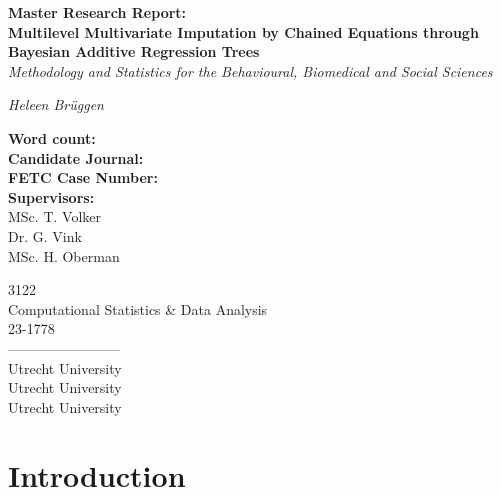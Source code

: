 \documentclass[10pt, a4paper, titlepage]{article}
\begin{document}
\begin{titlingpage}
\begin{center}
\Huge\textbf{Master Research Report:  \\ Multilevel Multivariate Imputation by Chained Equations through Bayesian Additive Regression Trees} \\
\Large\textit{Methodology and Statistics for the Behavioural, Biomedical and Social Sciences}

\vspace{.5cm}

\normalsize\textit{Heleen Brüggen}

\vspace{15cm}

\begin{minipage}{0.5\textwidth}
\begin{flushleft}

\textbf{Word count:} \\
\textbf{Candidate Journal:} \\
\textbf{FETC Case Number:} \\
\textbf{Supervisors:} \\
MSc. T. Volker \\
Dr. G. Vink \\
 MSc. H. Oberman
\end{flushleft}
\end{minipage}%
\begin{minipage}{0.5\textwidth}
\begin{flushright}

3122 \\
Computational Statistics \& Data Analysis \\
23-1778 \\
------------------------\\
Utrecht University \\
Utrecht University \\
Utrecht University
\end{flushright}
\end{minipage}

\end{center}
\end{titlingpage}

\newpage

\section{Introduction}
\end{document}
